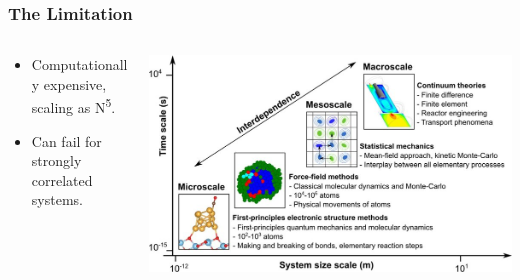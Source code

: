 \begin{frame}
    \frametitle{The Limitation}
    \begin{columns}[T]
        \begin{column}{0.45\textwidth}
            \vspace{2cm}
            \begin{itemize}
                \item Computationally expensive, scaling as N\textsuperscript{5}.
                \item Can fail for strongly correlated systems.
            \end{itemize}
        \end{column}
        \begin{column}{0.45\textwidth}
            \includegraphics[width=\textwidth]{images/MP23.png}
        \end{column}
    \end{columns}
\end{frame}

